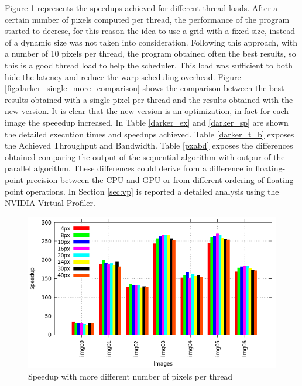 \documentclass[a4paper]{article}
\begin{document}
Figure \ref{fig:darker_try_histo} represents the speedups achieved for different thread loads. After a certain number of pixels computed per thread, the performance of the program started to decrese, for this reason the idea to use a grid with a fixed size, instead of a dynamic size was not taken into consideration. Following this approach, with a number of 10 pixels per thread, the program obtained often the best results, so this is a good thread load to help the scheduler. This load was sufficient to both hide the latency and reduce the warp scheduling overhead. Figure \ref{fig:darker_single_more_comparison} shows the comparison between the best results obtained with a single pixel per thread and the results obtained with the new version. It is clear that the new version is an optimization, in fact for each image the speeedup increased. In Table \ref{darker_ex} and \ref{darker_sp} are shown the detailed execution times and speedups achieved. Table \ref{darker_t_b} exposes the Achieved Throughput and Bandwidth. Table \ref{pxabd} exposes the differences obtained comparing the output of the sequential algorithm with outpur of the parallel algorithm. These differences could derive from a difference in floating-point precision between the CPU and GPU or from different ordering of floating-point operations. In Section \ref{sec:vp} is reported a detailed analysis using the NVIDIA Virtual Profiler.
    
\begin{figure}[!ht]
    \centering
    \includegraphics[width=0.9\linewidth]{res/new/darker_try_histo}
    \caption{Speedup with more different number of pixels per thread}
    \label{fig:darker_try_histo}
\end{figure}
\FloatBarrier
\end{document}
